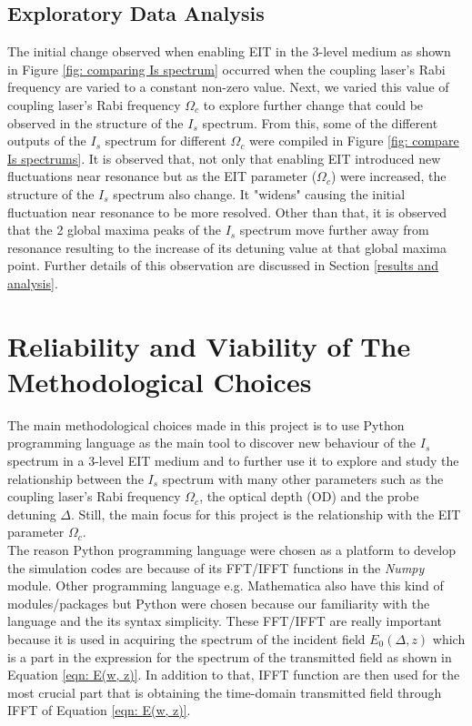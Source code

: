 \subsection{Exploratory Data Analysis}
The initial change observed when enabling EIT in the 3-level medium as shown in Figure \ref{fig: comparing Is spectrum} occurred when the coupling laser's Rabi frequency are varied to a constant non-zero value. Next, we varied this value of coupling laser's Rabi frequency $\Omega_{c}$ to explore further change that could be observed in the structure of the $I_{s}$ spectrum. From this, some of the different outputs of the $I_{s}$ spectrum for different $\Omega_{c}$ were compiled in Figure \ref{fig: compare Is spectrums}. It is observed that, not only that enabling EIT introduced new fluctuations near resonance but as the EIT parameter ($\Omega_{c}$) were increased, the structure of the $I_{s}$ spectrum also change. It "widens" causing the initial fluctuation near resonance to be more resolved. Other than that, it is observed that the 2 global maxima peaks of the $I_{s}$ spectrum move further away from resonance resulting to the increase of its detuning value at that global maxima point. Further details of this observation are discussed in Section \ref{results and analysis}.


\section{Reliability and Viability of The Methodological Choices}
The main methodological choices made in this project is to use Python programming language as the main tool to discover new behaviour of the $I_{s}$ spectrum in a 3-level EIT medium and to further use it to explore and study the relationship between the $I_{s}$ spectrum with many other parameters such as the coupling laser's Rabi frequency $\Omega_{c}$, the optical depth (OD) and the probe detuning $\Delta$. Still, the main focus for this project is the relationship with the EIT parameter $\Omega_{c}$.\\

The reason Python programming language were chosen as a platform to develop the simulation codes are because of its FFT/IFFT functions in the \textit{Numpy} module. Other programming language e.g. Mathematica also have this kind of modules/packages but Python were chosen because our familiarity with the language and the its syntax simplicity. These FFT/IFFT are really important because it is used in acquiring the spectrum of the incident field $E_{0}(\Delta, z)$ which is a part in the expression for the spectrum of the transmitted field as shown in Equation \ref{eqn: E(w, z)}. In addition to that, IFFT function are then used for the most crucial part that is obtaining the time-domain transmitted field through IFFT of Equation \ref{eqn: E(w, z)}.\\

